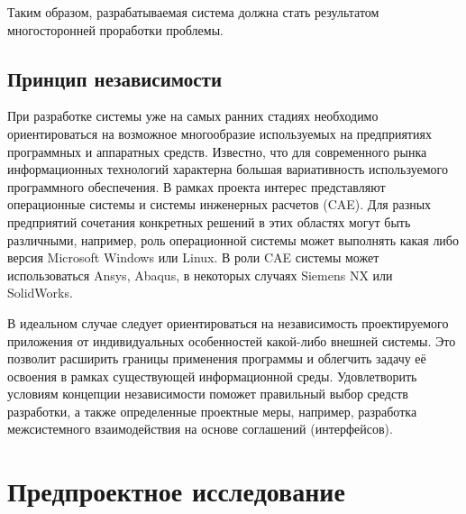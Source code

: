 \documentclass[14pt,oneside,final]{extreport}
\begin{document}
	Таким образом, разрабатываемая система должна стать результатом многосторонней проработки проблемы. 
	    

	\section{Принцип независимости}
	При разработке системы уже на самых ранних стадиях необходимо ориентироваться на возможное многообразие используемых на  предприятиях программных и аппаратных средств. Известно, что для  современного рынка информационных технологий характерна большая вариативность используемого программного обеспечения. В рамках проекта интерес представляют операционные системы и системы инженерных расчетов (CAE). Для разных предприятий сочетания конкретных решений в этих областях могут быть различными, например, роль операционной системы может выполнять какая либо версия Microsoft Windows или  Linux. В роли CAE системы может использоваться Ansys, Abaqus, в некоторых  случаях Siemens NX или SolidWorks. 
	
	В идеальном случае следует ориентироваться на независимость проектируемого приложения от индивидуальных особенностей какой-либо внешней системы. Это позволит расширить границы применения программы и облегчить задачу её освоения в рамках существующей информационной среды. Удовлетворить условиям концепции независимости поможет правильный выбор средств разработки, а также определенные проектные меры, например, разработка межсистемного взаимодействия на основе соглашений (интерфейсов). 
	
	\chapter{Предпроектное исследование}
\end{document}
